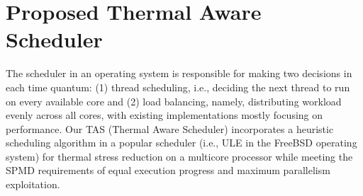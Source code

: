 \documentclass[times, 10pt,twocolumn]{IEEEtran}
\begin{document}
\section{Proposed Thermal Aware Scheduler}
\label{sec:sdesign} 
The scheduler in an operating system is responsible for making two
decisions in each time quantum: (1) thread scheduling, i.e., deciding
the next thread to run on every available core and (2) load balancing,
namely, distributing workload evenly across all cores, with existing
implementations mostly focusing on performance.  Our TAS (Thermal Aware
Scheduler) incorporates a heuristic scheduling algorithm in a popular
scheduler (i.e., ULE in the FreeBSD operating system) for thermal stress
reduction on a multicore processor while meeting the SPMD requirements
of equal execution progress and maximum parallelism exploitation.
\end{document}
